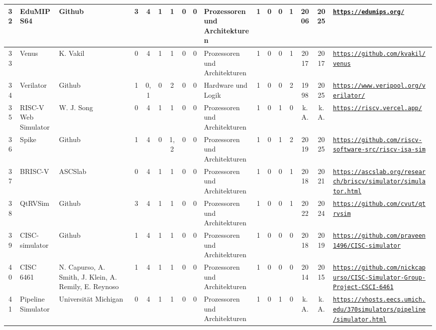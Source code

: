 \begin{landscape}
\begin{longtable}{|c|p{1cm}|p{1.3cm}|c|c|c|c|c|c|p{1.3cm}|c|c|c|c|c|c|p{2cm}|}
    32 & EduMIPS64 & Github & 3 & 4 & 1 & 1 & 0 & 0 & Prozessoren und Architekturen & 1 & 0 & 0 & 1 & 2006 & 2025 & \href{https://edumips.org/}{\nolinkurl{https://edumips.org/}} \\ \hline
    33 & Venus & K. Vakil & 0 & 4 & 1 & 1 & 0 & 0 & Prozessoren und Architekturen & 1 & 0 & 0 & 1 & 2017 & 2017 & \href{https://github.com/kvakil/venus}{\nolinkurl{https://github.com/kvakil/venus}} \\ \hline
    34 & Verilator & Github & 1 & 0,1 & 0 & 2 & 0 & 0 & Hardware und Logik & 1 & 0 & 0 & 2 & 1998 & 2025 & \href{https://www.veripool.org/verilator/}{\nolinkurl{https://www.veripool.org/verilator/}} \\ \hline
    35 & RISC-V Web Simulator & W. J. Song & 0 & 4 & 1 & 1 & 0 & 0 & Prozessoren und Architekturen & 1 & 0 & 1 & 0 & k.A. & k.A. & \href{https://riscv.vercel.app/}{\nolinkurl{https://riscv.vercel.app/}} \\ \hline
    36 & Spike & Github & 1 & 4 & 0 & 1,2 & 0 & 0 & Prozessoren und Architekturen & 1 & 0 & 1 & 2 & 2019 & 2025 & \href{https://github.com/riscv-software-src/riscv-isa-sim}{\nolinkurl{https://github.com/riscv-software-src/riscv-isa-sim}} \\ \hline
    37 & BRISC-V & ASCSlab & 0 & 4 & 1 & 1 & 0 & 0 & Prozessoren und Architekturen & 1 & 0 & 0 & 1 & 2018 & 2021 & \href{https://ascslab.org/research/briscv/simulator/simulator.html}{\nolinkurl{https://ascslab.org/research/briscv/simulator/simulator.html}} \\ \hline
    38 & QtRVSim & Github & 3 & 4 & 1 & 1 & 0 & 0 & Prozessoren und Architekturen & 1 & 0 & 0 & 1 & 2022 & 2024 & \href{https://github.com/cvut/qtrvsim}{\nolinkurl{https://github.com/cvut/qtrvsim}} \\ \hline
    39 & CISC-simulator & Github & 1 & 4 & 1 & 1 & 0 & 0 & Prozessoren und Architekturen & 1 & 0 & 0 & 0 & 2018 & 2019 & \href{https://github.com/praveen1496/CISC-simulator}{\nolinkurl{https://github.com/praveen1496/CISC-simulator}} \\ \hline
    40 & CISC 6461 & N. Capurso, A. Smith, J. Klein, A. Remily, E. Reynoso & 1 & 4 & 1 & 1 & 0 & 0 & Prozessoren und Architekturen & 1 & 0 & 0 & 0 & 2014 & 2015 & \href{https://github.com/nickcapurso/CISC-Simulator-Group-Project-CSCI-6461}{\nolinkurl{https://github.com/nickcapurso/CISC-Simulator-Group-Project-CSCI-6461}} \\ \hline
    41 & Pipeline Simulator & Universität Michigan & 0 & 4 & 1 & 1 & 0 & 0 & Prozessoren und Architekturen & 1 & 0 & 1 & 0 & k.A. & k.A. & \href{https://vhosts.eecs.umich.edu/370simulators/pipeline/simulator.html}{\nolinkurl{https://vhosts.eecs.umich.edu/370simulators/pipeline/simulator.html}} \\ \hline

\end{longtable}
\end{landscape}
